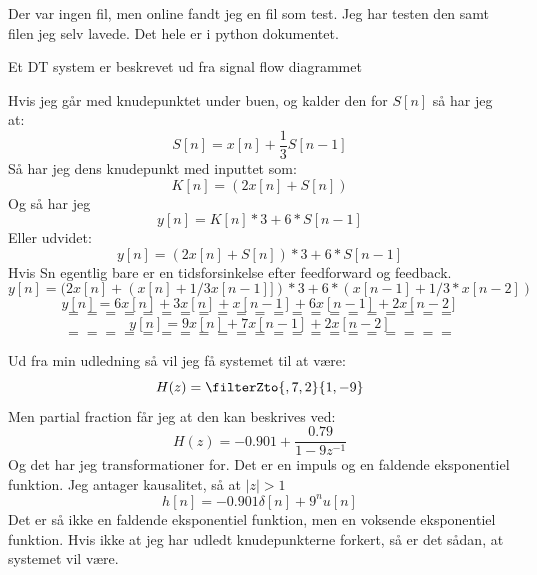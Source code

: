 \begin{Opgaver}
\begin{kapitel}
\begin{Opgave}
\begin{UnderOpgave}
            \end{UnderOpgave}
            \begin{UnderOpgave}
                Der var ingen fil, men online fandt jeg en fil som test. Jeg har testen den samt filen jeg selv lavede. Det hele er i python dokumentet.

            \end{UnderOpgave}
        \end{Opgave}
    \end{kapitel}
    \begin{kapitel}

        \begin{Opgave}[Opgave 9.1]
            Et DT system er beskrevet ud fra signal flow diagrammet
            \begin{UnderOpgave}
                Hvis jeg går med knudepunktet under buen, og kalder den for $S[n]$ så har jeg at: 
                \[S[n] = x[n] + \frac{1}{3}S[n - 1]\]
                Så har jeg dens knudepunkt med inputtet som: 
                \[K[n] = (2x[n] + S[n])\]
                Og så har jeg 
                \[y[n] = K[n] * 3 + 6 * S[n - 1]\]
                Eller udvidet: 
                \[y[n] = (2x[n] + S[n]) * 3 + 6 * S[n - 1]\]
                Hvis Sn egentlig bare er en tidsforsinkelse efter feedforward og feedback. 
                \[y[n] = (2x[n] + (x[n] + 1/3x[n - 1]]) * 3 + 6 * (x[n - 1] + 1/3*x[n - 2])\]
                \[y[n] = 6x[n] + 3x[n] + x[n - 1] + 6x[n - 1] + 2x[n - 2]\]
                \[=====================\]
                \[y[n] = 9x[n] + 7x[n - 1] + 2x[n - 2]\]
                \[=====================\]
                
            \end{UnderOpgave}
            \begin{UnderOpgave}
                Ud fra min udledning så vil jeg få systemet til at være: 
                \[H(z) = \filterZto{, 7, 2}{1, -9}\]
                Men partial fraction får jeg at den kan beskrives ved: 
                \[H(z) = -0.901 + \frac{0.79}{1 - 9z^{-1}}\]
                Og det har jeg transformationer for. Det er en impuls og en faldende eksponentiel funktion. 
                Jeg antager kausalitet, så at $|z| > 1$ 
                \[h[n] = -0.901\delta[n] + 9^nu[n]\] 
                Det er så ikke en faldende eksponentiel funktion, men en voksende eksponentiel funktion. 
                Hvis ikke at jeg har udledt knudepunkterne forkert, så er det sådan, at systemet vil være. 


\end{UnderOpgave}
\end{Opgave}
\end{kapitel}
\end{Opgaver}
